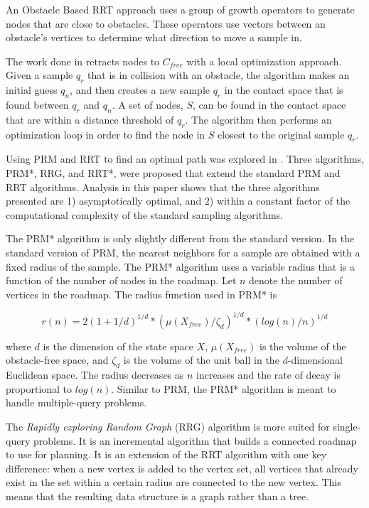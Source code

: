 \documentclass[10pt,conference]{ieeeconf}
\begin{document}
An Obstacle Based RRT approach \cite{tang2006obstacle} uses a group of growth operators to generate nodes that are close to obstacles. These operators use vectors between an obstacle's vertices to determine what direction to move a sample in. 

The work done in \cite{zhang2008efficient} retracts nodes to $C_{free}$ with a local optimization approach. Given a sample $q_r$ that is in collision with an obstacle, the algorithm makes an initial guess $q_n$, and then creates a new sample $q_c$ in the contact space that is found between $q_r$ and $q_n$. A set of nodes, $S$, can be found in the contact space that are within a distance threshold of $q_r$. The algorithm then performs an optimization loop in order to find the node in $S$ closest to the original sample $q_r$.


Using PRM and RRT to find an optimal path was explored in \cite{karaman2011sampling}. Three algorithms, PRM*, RRG, and RRT*, were proposed that extend the standard PRM and RRT algorithms. Analysis in this paper shows that the three algorithms presented are 1) asymptotically optimal, and 2) within a constant factor of the computational complexity of the standard sampling algorithms. 

The PRM* algorithm is only slightly different from the standard version. In the standard version of PRM, the nearest neighbors for a sample are obtained with a fixed radius of the sample. The PRM* algorithm uses a variable radius that is a function of the number of nodes in the roadmap. Let $n$ denote the number of vertices in the roadmap. The radius function used in PRM* is 

\begin{equation}
r(n) = 2(1+1/d)^{1/d}*(\mu(X_{free})/ \zeta_d)^{1/d} * (log(n)/n)^{1/d}
\end{equation}

where $d$ is the dimension of the state space $X$, $\mu(X_{free})$ is the volume of the obstacle-free space, and $\zeta_d$ is the volume of the unit ball in the $d$-dimensional Euclidean space. The radius decreases as $n$ increases and the rate of decay is proportional to $log(n)$. Similar to PRM, the PRM* algorithm is meant to handle multiple-query problems. 

The \emph{Rapidly exploring Random Graph} (RRG) algorithm is more suited for single-query problems. It is an incremental algorithm that builds a connected roadmap to use for planning. It is an extension of the RRT algorithm with one key difference: when a new vertex is added to the vertex set, all vertices that already exist in the set within a certain radius are connected to the new vertex. This means that the resulting data structure is a graph rather than a tree.
\end{document}
